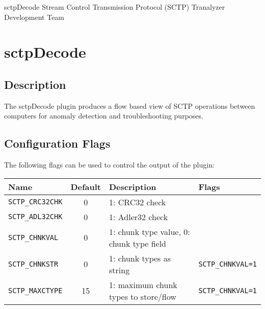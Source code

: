 \documentclass[documentation]{subfiles}
\begin{document}
\trantitle
    {sctpDecode}
    {Stream Control Transmission Protocol (SCTP)}
    {Tranalyzer Development Team}

\section{sctpDecode}\label{s:sctpDecode}

\subsection{Description}
The sctpDecode plugin produces a flow based view of SCTP operations between computers for anomaly detection and troubleshooting purposes.

\subsection{Configuration Flags}
The following flags can be used to control the output of the plugin:
\begin{longtable}{lcll}
    \toprule
    {\bf Name} & {\bf Default} & {\bf Description} & {\bf Flags}\\
    \midrule\endhead%
    {\tt SCTP\_CRC32CHK} &  0 & 1: CRC32 check                           &\\
    {\tt SCTP\_ADL32CHK} &  0 & 1: Adler32 check                         &\\
    {\tt SCTP\_CHNKVAL}  &  0 & 1: chunk type value, 0: chunk type field &\\
    {\tt SCTP\_CHNKSTR}  &  0 & 1: chunk types as string                 & {\tt SCTP\_CHNKVAL=1}\\
    {\tt SCTP\_MAXCTYPE} & 15 & 1: maximum chunk types to store/flow     & {\tt SCTP\_CHNKVAL=1}\\

    \bottomrule
\end{longtable}
\end{document}
